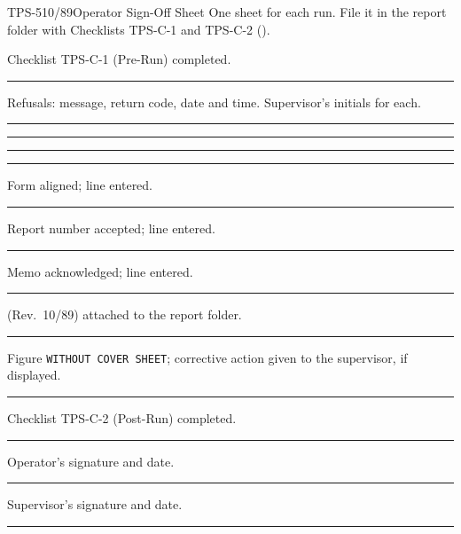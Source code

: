\begin{FormSheet}{TPS-5}{10/89}{Operator Sign-Off Sheet}
One sheet for each run.  File it in the report folder with Checklists
TPS-C-1 and TPS-C-2 ().\par\vspace{6pt}
\quad{}\quad{}\par\vspace{6pt}
\newcommand\SignLine[2]{\par\addvspace{7pt}\noindent\makebox[7mm][l]{\sffamily\bfseries #1}%
  \parbox[t]{88mm}{\RaggedRight #2}\hfill\rule{30mm}{0.4pt}\par}
\SignLine{1}{Checklist TPS-C-1 (Pre-Run) completed.}
\SignLine{2}{Refusals: message, return code, date and time.  Supervisor's
  initials for each.}
\par\vspace{4pt}\rule{\linewidth}{0.25pt}\par\vspace{8pt}\rule{\linewidth}{0.25pt}\par
\vspace{8pt}\rule{\linewidth}{0.25pt}\par
\SignLine{3}{Form aligned;  line entered.}
\SignLine{4}{Report number accepted;  line entered.}
\SignLine{5}{Memo acknowledged;  line entered.}
\SignLine{6}{ (Rev.\ 10/89) attached to the report folder.}
\SignLine{7}{Figure \texttt{WITHOUT COVER SHEET}; corrective action given to
  the supervisor, if displayed.}
\SignLine{8}{Checklist TPS-C-2 (Post-Run) completed.}
\SignLine{9}{Operator's signature and date.}
\SignLine{10}{Supervisor's signature and date.}
\end{FormSheet}
